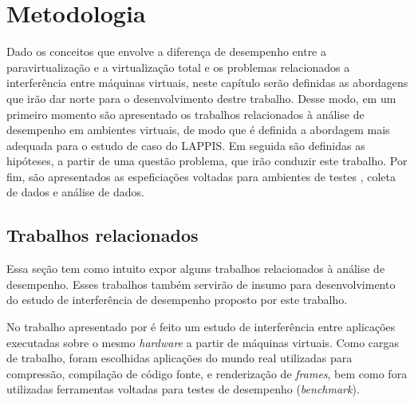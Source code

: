 \chapter{Metodologia}
Dado os conceitos que envolve a diferença de desempenho entre a paravirtualização e a virtualização total e os problemas relacionados a interferência entre máquinas virtuais, neste capítulo serão definidas as abordagens que irão dar norte para o desenvolvimento destre trabalho. Desse modo, em um primeiro momento são apresentado os trabalhos relacionados à análise de desempenho em ambientes virtuais, de modo que é definida a abordagem mais adequada para o estudo de caso do LAPPIS. Em seguida são definidas as hipóteses, a partir de uma questão problema, que irão conduzir este trabalho. Por fim, são apresentados as espeficiações voltadas para ambientes de testes , coleta de dados e análise de dados.
\section{Trabalhos relacionados}
Essa seção tem como intuito expor alguns trabalhos relacionados à análise de desempenho. Esses trabalhos também servirão de insumo para desenvolvimento do estudo de interferência de desempenho proposto por este trabalho.

No trabalho apresentado por \cite{koh2007} é feito um estudo de interferência entre aplicações executadas sobre o mesmo \textit{hardware} a partir de máquinas virtuais. Como cargas de trabalho, foram escolhidas aplicações do mundo real utilizadas para compressão, compilação de código fonte, e renderização de \textit{frames}, bem como fora utilizadas ferramentas voltadas para testes de desempenho (\textit{benchmark}).

